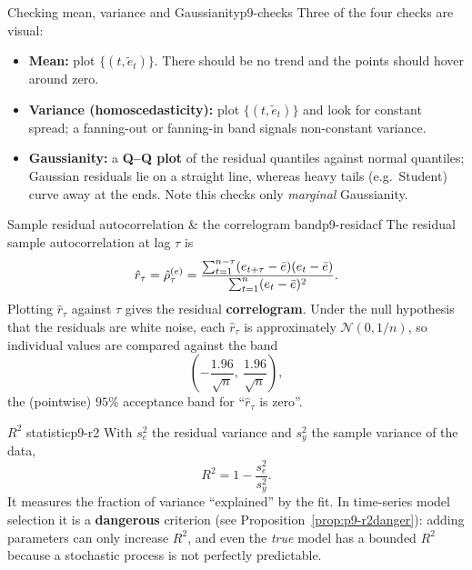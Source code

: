 \begin{definition}{Checking mean, variance and Gaussianity}{p9-checks}
Three of the four checks are visual:
\begin{itemize}
  \item \textbf{Mean:} plot $\{(t,\tilde e_t)\}$. There should be no trend and
        the points should hover around zero.
  \item \textbf{Variance (homoscedasticity):} plot $\{(t,\tilde e_t)\}$ and
        look for constant spread; a fanning-out or fanning-in band signals
        non-constant variance.
  \item \textbf{Gaussianity:} a \textbf{Q--Q plot} of the residual quantiles
        against normal quantiles; Gaussian residuals lie on a straight line,
        whereas heavy tails (e.g.\ Student) curve away at the ends. Note this
        checks only \emph{marginal} Gaussianity.
\end{itemize}
\end{definition}

\begin{definition}{Sample residual autocorrelation \& the correlogram band}{p9-residacf}
The residual sample autocorrelation at lag $\tau$ is
\[
\hat r_\tau = \hat{\rho}^{(e)}_\tau
= \frac{\sum_{t=1}^{n-\tau}(e_{t+\tau}-\bar e)(e_t-\bar e)}
       {\sum_{t=1}^{n}(e_t-\bar e)^2 }.
\]
Plotting $\hat r_\tau$ against $\tau$ gives the residual \textbf{correlogram}.
Under the null hypothesis that the residuals are white noise, each $\hat r_\tau$
is approximately $\mathcal N(0,1/n)$, so individual values are compared against
the band
\[
\left(-\frac{1.96}{\sqrt n},\ \frac{1.96}{\sqrt n}\right),
\]
the (pointwise) $95\%$ acceptance band for ``$\hat r_\tau$ is zero''.
\end{definition}

\begin{definition}{$R^2$ statistic}{p9-r2}
With $s_e^2$ the residual variance and $s_y^2$ the sample variance of the data,
\[
R^2 = 1 - \frac{s_e^2}{s_y^2}.
\]
It measures the fraction of variance ``explained'' by the fit. In time-series
model selection it is a \textbf{dangerous} criterion (see
Proposition~\ref{prop:p9-r2danger}): adding parameters can only increase $R^2$,
and even the \emph{true} model has a bounded $R^2$ because a stochastic process
is not perfectly predictable.
\end{definition}

